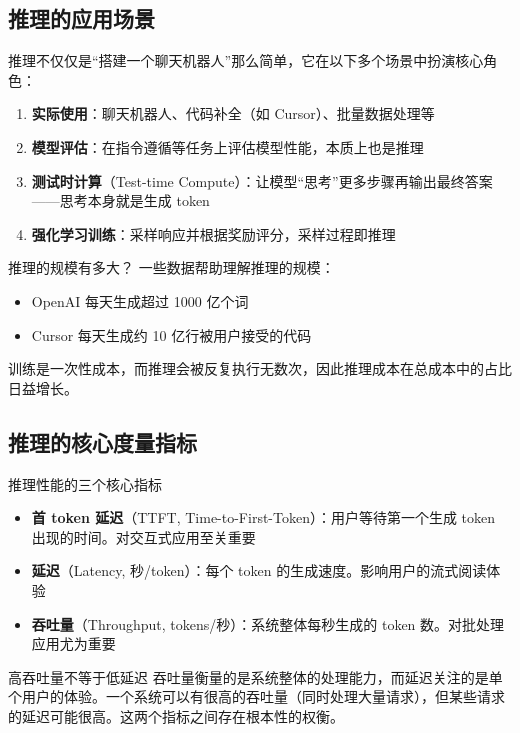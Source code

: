 \documentclass[a4paper]{article}
\begin{document}
\subsection{推理的应用场景}

推理不仅仅是``搭建一个聊天机器人''那么简单，它在以下多个场景中扮演核心角色：

\begin{enumerate}
    \item \textbf{实际使用}：聊天机器人、代码补全（如 Cursor）、批量数据处理等
    \item \textbf{模型评估}：在指令遵循等任务上评估模型性能，本质上也是推理
    \item \textbf{测试时计算}（Test-time Compute）：让模型``思考''更多步骤再输出最终答案——思考本身就是生成 token
    \item \textbf{强化学习训练}：采样响应并根据奖励评分，采样过程即推理
\end{enumerate}

\begin{knowledgebox}{推理的规模有多大？}
一些数据帮助理解推理的规模：
\begin{itemize}
    \item OpenAI 每天生成超过 1000 亿个词
    \item Cursor 每天生成约 10 亿行被用户接受的代码
\end{itemize}
训练是一次性成本，而推理会被反复执行无数次，因此推理成本在总成本中的占比日益增长。
\end{knowledgebox}

\subsection{推理的核心度量指标}

\begin{importantbox}{推理性能的三个核心指标}
\begin{itemize}
    \item \textbf{首 token 延迟}（TTFT, Time-to-First-Token）：用户等待第一个生成 token 出现的时间。对交互式应用至关重要
    \item \textbf{延迟}（Latency, 秒/token）：每个 token 的生成速度。影响用户的流式阅读体验
    \item \textbf{吞吐量}（Throughput, tokens/秒）：系统整体每秒生成的 token 数。对批处理应用尤为重要
\end{itemize}
\end{importantbox}

\begin{warningbox}{高吞吐量不等于低延迟}
吞吐量衡量的是系统整体的处理能力，而延迟关注的是单个用户的体验。一个系统可以有很高的吞吐量（同时处理大量请求），但某些请求的延迟可能很高。这两个指标之间存在根本性的权衡。
\end{warningbox}
\end{document}
